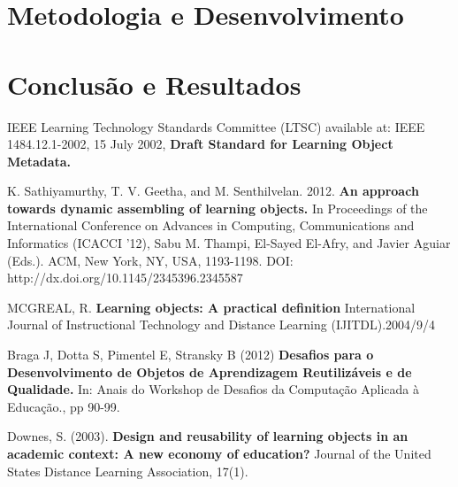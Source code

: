 \documentclass[12pt,openright,oneside,a4paper,english,french,spanish,brazil]{unifil}
\begin{document}
\chapter {Metodologia e Desenvolvimento}

\chapter {Conclusão e Resultados}


\cleardoublepage

\postextual


\begin{thebibliography}{99}

{IEEE Learning Technology Standards Committee (LTSC) available at: IEEE 1484.12.1-2002, 15 July 2002, \textbf{Draft Standard for Learning Object Metadata.}}

{K. Sathiyamurthy, T. V. Geetha, and M. Senthilvelan. 2012. \textbf{An approach towards dynamic assembling of learning objects.} In Proceedings of the International Conference on Advances in Computing, Communications and Informatics (ICACCI '12), Sabu M. Thampi, El-Sayed El-Afry, and Javier Aguiar (Eds.). ACM, New York, NY, USA, 1193-1198. DOI: http://dx.doi.org/10.1145/2345396.2345587}

{MCGREAL, R. \textbf{Learning objects: A practical definition} International Journal of Instructional Technology and Distance Learning (IJITDL).2004/9/4}

{Braga J, Dotta S, Pimentel E, Stransky B (2012) \textbf{Desafios para o
Desenvolvimento de Objetos de Aprendizagem Reutilizáveis e de Qualidade.} In: Anais do Workshop de Desafios da Computação Aplicada à Educação., pp 90-99.}

{Downes, S. (2003). \textbf{Design and reusability of learning objects in an academic context: A new economy of education?} Journal of the United States Distance Learning Association, 17(1).}

\end{thebibliography}
\end{document}
